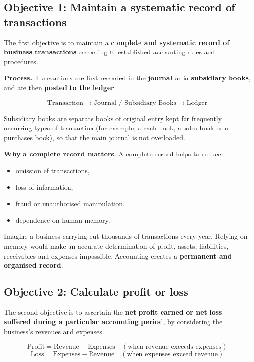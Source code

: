 \documentclass[11pt,a4paper]{article}
\begin{document}
\subsection{Objective 1: Maintain a systematic record of transactions}

The first objective is to maintain a \textbf{complete and systematic record of business
transactions} according to established accounting rules and procedures.

\textbf{Process.} Transactions are first recorded in the \textbf{journal} or in \textbf{subsidiary
books}, and are then \textbf{posted to the ledger}:

\[
\text{Transaction}\rightarrow\text{Journal / Subsidiary Books}\rightarrow\text{Ledger}
\]

\begin{notebox}
Subsidiary books are separate books of original entry kept for frequently occurring types of
transaction (for example, a cash book, a sales book or a purchases book), so that the main
journal is not overloaded.
\end{notebox}

\textbf{Why a complete record matters.} A complete record helps to reduce:
\begin{itemize}
  \item omission of transactions,
  \item loss of information,
  \item fraud or unauthorised manipulation,
  \item dependence on human memory.
\end{itemize}

Imagine a business carrying out thousands of transactions every year. Relying on memory would
make an accurate determination of profit, assets, liabilities, receivables and expenses
impossible. Accounting creates a \textbf{permanent and organised record}.

\subsection{Objective 2: Calculate profit or loss}

The second objective is to ascertain the \textbf{net profit earned or net loss suffered during
a particular accounting period}, by considering the business's revenues and expenses.

\[
\boxed{\text{Profit}=\text{Revenue}-\text{Expenses}}\quad(\text{when revenue exceeds expenses})
\]
\[
\boxed{\text{Loss}=\text{Expenses}-\text{Revenue}}\quad(\text{when expenses exceed revenue})
\]
\end{document}
